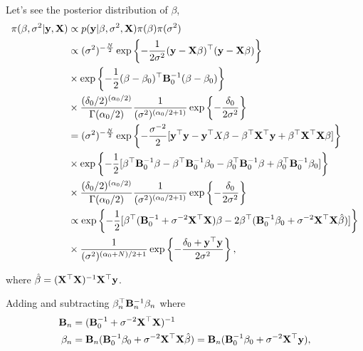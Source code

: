 \begin{enumerate}[leftmargin=*]
Let's see the posterior distribution of $\beta$, 
\begin{align*}
	\pi(\beta, \sigma^2|{\bf{y}}, {\bf{X}}) & \propto p({\bf{y}}|\beta, \sigma^2, {\bf{X}}) \pi(\beta) \pi(\sigma^2) \\
	&\propto (\sigma^2)^{-\frac{N}{2}}\exp\left\{-\frac{1}{2\sigma^2}({\bf{y}}-{\bf{X}}\beta)^{\top}({\bf{y}}-{\bf{X}}\beta)\right\}\\
	&\times \exp\left\{-\frac{1}{2}(\beta - \beta _0)^{\top}{\bf{B}}_0^{-1}(\beta - \beta _0)\right\}\\
	&\times\frac{(\delta_0/2)^{(\alpha_0/2)}}{\Gamma(\alpha_0/2)}\frac{1}{(\sigma^2)^{(\alpha_0/2+1)}}\exp\left\{-\frac{\delta_0}{2\sigma^2}\right\}\\
	&=(\sigma^2)^{-\frac{N}{2}}\exp\left\{-\frac{\sigma^{-2}}{2}[{\bf{y}}^{\top}{\bf{y}}-{\bf{y}}^{\top}X\beta-\beta^{\top}{\bf{X}}^{\top}{\bf{y}}+\beta^{\top}{\bf{X}}^{\top}{\bf{X}}\beta]\right\}\\
	& \times \exp\left\{-\frac{1}{2}[\beta^{\top}{\bf{B}}_0^{-1}\beta-\beta^{\top}{\bf{B}}_0^{-1}\beta_0-\beta_0^{\top}{\bf{B}}_0^{-1}\beta+\beta_0^{\top}{\bf{B}}_0^{-1}\beta_0]\right\}\\
	&\times \frac{(\delta_0/2)^{(\alpha_0/2)}}{\Gamma(\alpha_0/2)}\frac{1}{(\sigma^2)^{(\alpha_0/2+1)}}\exp\left\{-\frac{\delta_0}{2\sigma^2}\right\}\\
	&\propto \exp\left\{-\frac{1}{2}[\beta^{\top}({\bf{B}}_0^{-1}+\sigma^{-2}{\bf{X}}^{\top}{\bf{X}})\beta-2\beta^{\top}({\bf{B}}_0^{-1}\beta_0+\sigma^{-2}{\bf{X}}^{\top}{\bf{X}}\hat{\beta})]\right\}\\
	&\times\frac{1}{(\sigma^2)^{(\alpha_0+N)/2+1}}\exp\left\{-\frac{\delta_0+{\bf{y}}^{\top}{\bf{y}}}{2\sigma^2}\right\},
\end{align*}

where $\hat{\beta}=({\bf{X}}^{\top}{\bf{X}})^{-1}{\bf{X}}^{\top}{\bf{y}}$.

Adding and subtracting $\beta_n^{\top}{\bf{B}}_n^{-1}\beta_n$ where
\begin{align*}
	{\bf{B}}_n & = ({\bf{B}}_0^{-1}+\sigma^{-2}{\bf{X}}^{\top}{\bf{X}})^{-1}\\
	\beta_n&={\bf{B}}_n({\bf{B}}_0^{-1}\beta_0+\sigma^{-2}{\bf{X}}^{\top}{\bf{X}}\hat{\beta})={\bf{B}}_n({\bf{B}}_0^{-1}\beta_0+\sigma^{-2}{\bf{X}}^{\top}{\bf{y}}),
\end{align*}


\end{enumerate}
